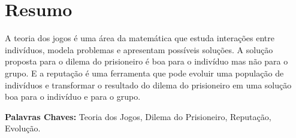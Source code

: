 %

\chapter*{Resumo}

A teoria dos jogos é uma área da matemática que estuda interações entre indivíduos, modela problemas e apresentam possíveis soluções. A solução proposta para o dilema do prisioneiro é boa para o indivíduo mas não para o grupo. E a reputação é uma ferramenta que pode evoluir uma população de indivíduos e transformar o resultado do dilema do prisioneiro em uma solução boa para o indivíduo e para o grupo.

\begin{flushleft}
\textbf{Palavras Chaves:} Teoria dos Jogos, Dilema do Prisioneiro, Reputação, Evolução.
\end{flushleft}



%